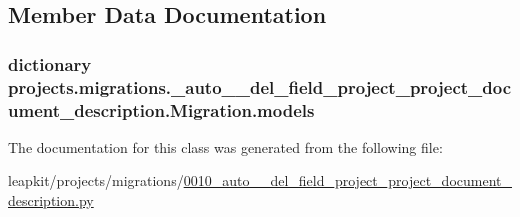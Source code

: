 \subsection{Member Data Documentation}
\hypertarget{classprojects_1_1migrations_1_10010__auto____del__field__project__project__document__description_1_1_migration_a85884e9b892b3d9d792b8f966c7f9090}{
\subsubsection[{models}]{\setlength{\rightskip}{0pt plus 5cm}dictionary projects.\-migrations.\-\_\-auto\-\_\-\-\_\-del\-\_\-field\-\_\-project\-\_\-project\-\_\-document\-\_\-description.\-Migration.\-models\hspace{0.3cm}{\ttfamily [static]}}}\label{classprojects_1_1migrations_1_10010__auto____del__field__project__project__document__description_1_1_migration_a85884e9b892b3d9d792b8f966c7f9090}


The documentation for this class was generated from the following file\-:\begin{DoxyCompactItemize}
\item 
leapkit/projects/migrations/\hyperlink{0010__auto____del__field__project__project__document__description_8py}{0010\-\_\-auto\-\_\-\-\_\-del\-\_\-field\-\_\-project\-\_\-project\-\_\-document\-\_\-description.\-py}\end{DoxyCompactItemize}

